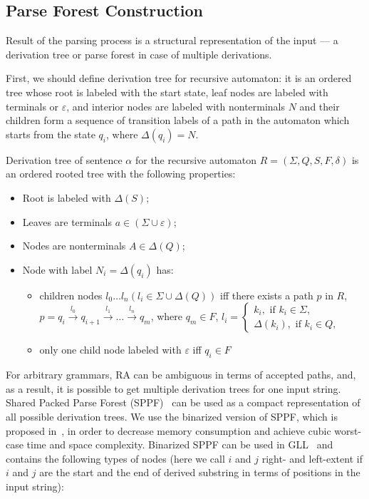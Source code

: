 \documentclass[runningheads,a4paper]{llncs}
\begin{document}
\subsection{Parse Forest Construction}

Result of the parsing process is a structural representation of the input --- a derivation tree or parse forest in case of multiple derivations.

First, we should define derivation tree for recursive automaton: it is an ordered tree whose root is labeled with the start state,
leaf nodes are labeled with terminals or $\varepsilon$, and interior nodes are labeled with  nonterminals $N$ and their children form a sequence of transition labels of a path in the
automaton which starts from the state $q_i$, where $ \Delta(q_i) = N $.

\begin{mydef}

Derivation tree of sentence $\alpha$ for the recursive automaton $R=(\Sigma, Q, S, F, \delta)$ is an ordered rooted tree with the following properties:

\begin{itemize}
    \item Root is labeled with $\Delta(S)$;
    \item Leaves are terminals $a\in (\Sigma \cup \varepsilon)$;
    \item Nodes are nonterminals $A\in \Delta(Q)$;
    \item Node with label $N_i = \Delta(q_i)$ has:
    \begin{itemize}
        \item 
            children nodes $l_0 \dots l_n (l_i \in \Sigma \cup \Delta(Q))$ iff there exists a
            path $p$ in $R$, $p = q_i \xrightarrow[]{l_0} q_{i+1} \xrightarrow[]{l_1} \dots \xrightarrow{l_n} q_m$, where
            $q_m \in F$, $l_i = 
            \left\{
            \begin{matrix}
            k_i, \text{ if }  k_i \in \Sigma,\\
            \Delta(k_i), \text{ if } k_i \in Q,
            \end{matrix}
            \right.
            $
        \item only one child node labeled with $\varepsilon$ iff $ q_i \in F $
    \end{itemize}
\end{itemize}
\end{mydef}

For arbitrary grammars, RA can be ambiguous in terms of accepted paths, and, as a result, it is possible to get multiple derivation trees for one input string.
Shared Packed Parse Forest (SPPF)~\cite{SPPF} can be used as a compact representation of all possible derivation trees.
We use the binarized version of SPPF, which is proposed in~\cite{brnglr}, in order to decrease memory consumption and achieve cubic worst-case time and space complexity.
Binarized SPPF can be used in GLL~\cite{scott2013gll} and contains the following types of nodes (here we call $i$ and $j$ right- and left-extent if $i$ and $j$ are the start and the end of derived substring in terms of positions in the input string):
\end{document}
